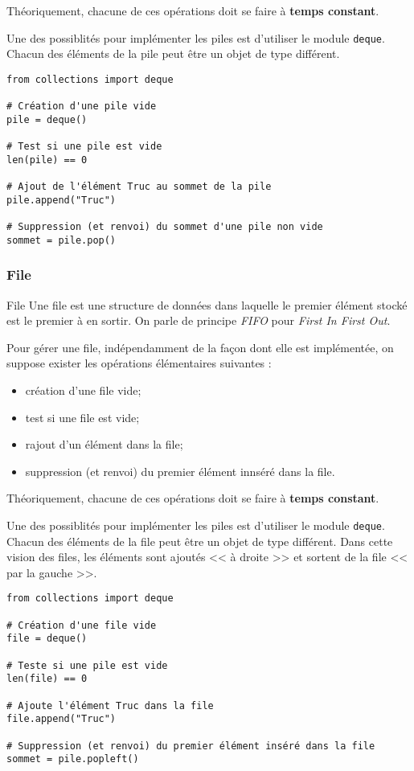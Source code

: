 Théoriquement, chacune de ces opérations doit se faire à \textbf{temps constant}.

Une des possiblités pour implémenter les piles est d'utiliser le module \texttt{deque}. Chacun des éléments de la pile peut être un objet de type différent.

\begin{lstlisting} 
from collections import deque

# Création d'une pile vide
pile = deque() 

# Test si une pile est vide
len(pile) == 0

# Ajout de l'élément Truc au sommet de la pile
pile.append("Truc")

# Suppression (et renvoi) du sommet d'une pile non vide
sommet = pile.pop()
\end{lstlisting}



\subsubsection{File}
\begin{defi}{File}
Une file est une structure de données dans laquelle le premier élément stocké est le premier à en sortir. On parle de principe \textit{FIFO} pour \textit{First In First Out}. 
\end{defi}

Pour gérer une file, indépendamment de la façon dont elle est implémentée, on suppose exister les opérations élémentaires suivantes : 
\begin{itemize}
\item création d'une file vide;
\item test si une file est vide;
\item rajout d'un élément dans la file;
\item suppression (et renvoi) du premier élément innséré dans la file.
\end{itemize}

Théoriquement, chacune de ces opérations doit se faire à \textbf{temps constant}.

Une des possiblités pour implémenter les piles est d'utiliser le module \texttt{deque}. Chacun des éléments de la file peut être un objet de type différent. Dans cette vision des files, les éléments sont ajoutés << à droite >> et sortent de la file << par la gauche >>.

\begin{lstlisting} 
from collections import deque

# Création d'une file vide
file = deque() 

# Teste si une pile est vide
len(file) == 0

# Ajoute l'élément Truc dans la file 
file.append("Truc")

# Suppression (et renvoi) du premier élément inséré dans la file
sommet = pile.popleft()

\end{lstlisting}


